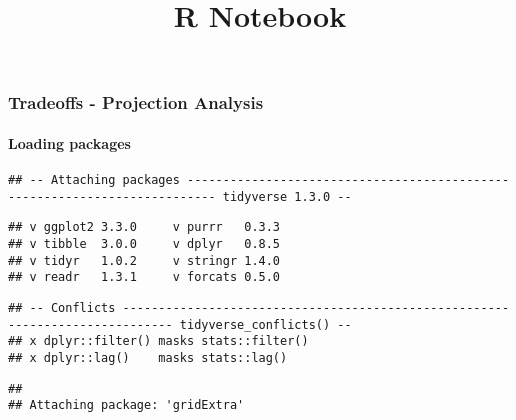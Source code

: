 \documentclass[]{article}
\title{R Notebook}
\author{}
\date{\vspace{-2.5em}}
\newenvironment{Shaded}{\begin{snugshade}}{\end{snugshade}}
\newcommand{\DataTypeTok}[1]{\textcolor[rgb]{0.13,0.29,0.53}{#1}}
\newcommand{\KeywordTok}[1]{\textcolor[rgb]{0.13,0.29,0.53}{\textbf{#1}}}
\newcommand{\NormalTok}[1]{#1}
\newcommand{\OperatorTok}[1]{\textcolor[rgb]{0.81,0.36,0.00}{\textbf{#1}}}
\newcommand{\OtherTok}[1]{\textcolor[rgb]{0.56,0.35,0.01}{#1}}
\let\oldparagraph\paragraph
\renewcommand{\paragraph}[1]{\oldparagraph{#1}\mbox{}}
\begin{document}
\maketitle

\hypertarget{tradeoffs---projection-analysis}{%
\subsubsection{Tradeoffs - Projection
Analysis}\label{tradeoffs---projection-analysis}}

\hypertarget{loading-packages}{%
\paragraph{Loading packages}\label{loading-packages}}

\begin{Shaded}
\end{Shaded}

\begin{verbatim}
## -- Attaching packages -------------------------------------------------------------------------- tidyverse 1.3.0 --
\end{verbatim}

\begin{verbatim}
## v ggplot2 3.3.0     v purrr   0.3.3
## v tibble  3.0.0     v dplyr   0.8.5
## v tidyr   1.0.2     v stringr 1.4.0
## v readr   1.3.1     v forcats 0.5.0
\end{verbatim}

\begin{verbatim}
## -- Conflicts ----------------------------------------------------------------------------- tidyverse_conflicts() --
## x dplyr::filter() masks stats::filter()
## x dplyr::lag()    masks stats::lag()
\end{verbatim}

\begin{verbatim}
## 
## Attaching package: 'gridExtra'
\end{verbatim}
\end{document}
